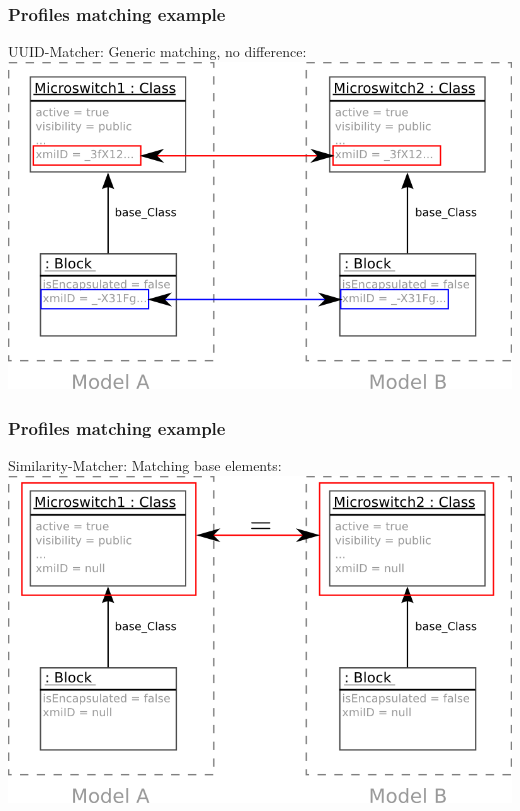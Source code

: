 \documentclass[10pt]{beamer}
\begin{document}
\begin{frame}
\frametitle{Profiles matching example}
\begin{center}
UUID-Matcher: Generic matching, no difference: \\
\medskip
\includegraphics[scale=0.8]{profilematcher_example2}\\
\end{center}

\end{frame}
\begin{frame}
\frametitle{Profiles matching example}
\begin{center}
Similarity-Matcher: Matching base elements: \\
\medskip
\includegraphics[scale=0.8]{profilematcher_example3}\\
\end{center}

\end{frame}
\end{document}
